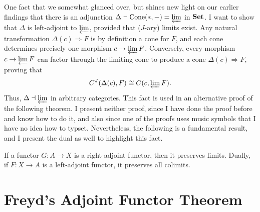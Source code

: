 One fact that we somewhat glanced over, but shines new light on our earlier findings that there is an adjunction $\Delta \dashv \operatorname{Cone} (*,-)=\varprojlim$ in $\mathbf{Set} $. I want to show that $\Delta $ is left-adjoint to $\varprojlim $, provided that ($J$-ary) limits exist. Any natural transformation $\Delta (c)\Rightarrow F$ is by definition a cone for $F$, and each cone determines precisely one morphism $c\to \varprojlim F$. Conversely, every morphism $c\to \varprojlim F$ can factor through the limiting cone to produce a cone $\Delta (c)\Rightarrow F$, proving that
\[
	C^J(\Delta (c),F)\cong C(c,\varprojlim F)
.\]
Thus, $\Delta \dashv \varprojlim $ in arbitrary categories. This fact is used in an alternative proof of the following theorem. I present neither proof, since I have done the proof before and know how to do it, and also since one of the proofs uses music symbols that I have no idea how to typset. Nevertheless, the following is a fundamental result, and I present the dual as well to highlight this fact.

\begin{theorem}\label{thm:5.9}
	If a functor $G : A \to X$ is a right-adjoint functor, then it preserves limits. Dually, if $F : X \to A$ is a left-adjoint functor, it preserves all colimits.
\end{theorem}

\section{Freyd's Adjoint Functor Theorem}

